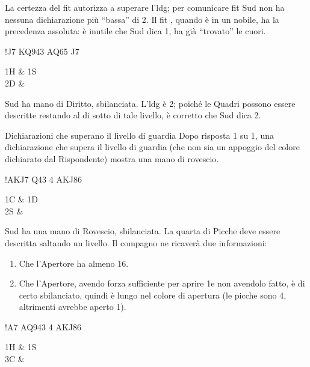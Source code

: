 \documentclass[../corsofiori.tex]{subfiles}
\begin{document}
La certezza del fit autorizza a superare l'\ac{ldg}; per comunicare fit Sud non ha nessuna dichiarazione più “bassa” di
2\He. Il fit , quando
è in un nobile, ha la precedenza assoluta: è
inutile che Sud dica 1\Sp, ha già “trovato” le
cuori.

\begin{center}
\hand!{J7} {KQ943} {AQ65} {J7}\quad \begin{biddingpair}
    1H & 1S\\
    2D & \\
\end{biddingpair}
\end{center}

Sud ha mano di Diritto, sbilanciata.
L'\ac{ldg} è 2\He; poiché le Quadri
possono essere descritte restando al di sotto
di tale livello, è corretto che Sud dica 2\Di.

\begin{regola}{Dichiarazioni che superano il livello di guardia}
Dopo risposta 1 su 1, una dichiarazione che supera il livello di guardia (che non sia un appoggio del colore dichiarato
dal Rispondente) mostra una mano di rovescio.
\end{regola}
\begin{center}
\hand!{AKJ7} {Q43} {4} {AKJ86}\quad\begin{biddingpair}
1C & 1D\\
2S & \\
\end{biddingpair}
\end{center}

Sud ha una mano di Rovescio, sbilanciata.
La quarta di Picche deve essere descritta
saltando un livello. Il compagno ne ricaverà
due informazioni:
\begin{enumerate}
\item Che l’Apertore ha almeno 16.
\item Che l’Apertore, avendo forza sufficiente per aprire 1\SA e non avendolo fatto, è di certo sbilanciato, quindi
    è lungo nel colore di apertura (le picche sono 4, altrimenti avrebbe aperto 1\Sp).
\end{enumerate}

\begin{center}
\hand!{A7} {AQ943} {4} {AKJ86}\quad\begin{biddingpair}
1H & 1S\\
3C & \\
\end{biddingpair}
\end{center}
\end{document}
